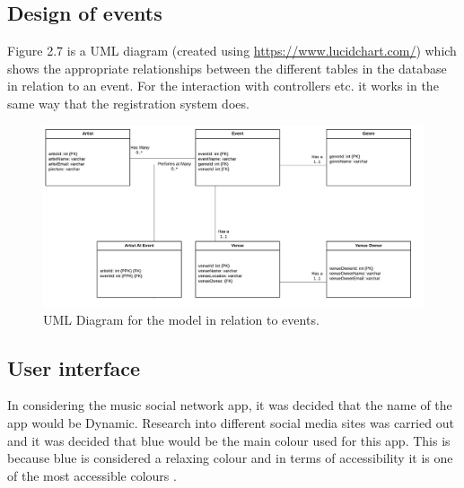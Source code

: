 \subsection{Design of events}

Figure 2.7 is a UML diagram (created using \url{https://www.lucidchart.com/}) which shows the appropriate relationships between the different tables in the database in relation to an event. For the interaction with controllers etc. it works in the same way that the registration system does.
\begin{center}
\begin{figure}[H]
\includegraphics[width=\textwidth,height=\textheight,keepaspectratio]{images/events}
\caption{UML Diagram for the model in relation to events.}
\end{figure}
\end{center}


\subsection{User interface}
In considering the music social network app, it was decided that the name of the app would be Dynamic. Research into different social media sites was carried out and it was decided that blue would be the main colour used for this app. This is because blue is considered a relaxing colour and in terms of accessibility it is one of the most accessible colours \cite{col}.
